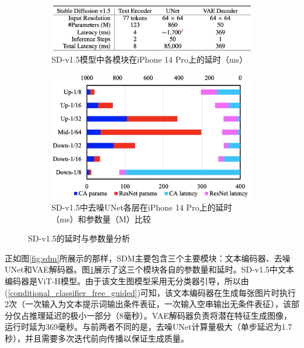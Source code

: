 \documentclass[11pt,a4paper,UTF8]{ctexart}
\begin{document}
\begin{figure}[htbp]
    \centering
    \begin{subfigure}[b]{0.49\textwidth}
        \centering
        \includegraphics[width=\linewidth]{img/sdv15_latency.jpg}
        \caption{SD-v1.5模型中各模块在iPhone 14 Pro上的延时（ms）}
        \label{fig:latency_three}
    \end{subfigure}
    \hfill
    \begin{subfigure}[b]{0.49\textwidth}
        \centering
        \includegraphics[width=\linewidth]{img/unet_latency_params.jpg}
        \caption{SD-v1.5中去噪UNet各层在iPhone 14 Pro上的延时（ms）和参数量（M）比较}
        \label{fig:latency_params_unet}
    \end{subfigure}
    \caption{SD-v1.5的延时与参数量分析}
    \label{fig:sd_v15}
\end{figure}

正如图\ref{fig:sdm}所展示的那样，SDM主要包含三个主要模块：文本编码器、去噪UNet和VAE解码器。图\ref{fig:latency_three}展示了这三个模块各自的参数量和延时。SD-v1.5中文本编码器是ViT-H模型\cite{radford2021learning}。由于该文生图模型采用无分类器引导，所以由(\ref{conditional_classifier_free_guided})可知，该文本编码器在生成每张图片时执行2次（一次输入为文本提示词输出条件表征，一次输入空串输出无条件表征），该部分仅占推理延迟的极小一部分（8毫秒）。VAE解码器负责将潜在特征生成图像，运行时延为369毫秒。与前两者不同的是，去噪UNet计算量极大（单步延迟为1.7秒），并且需要多次迭代前向传播以保证生成质量。
\end{document}
